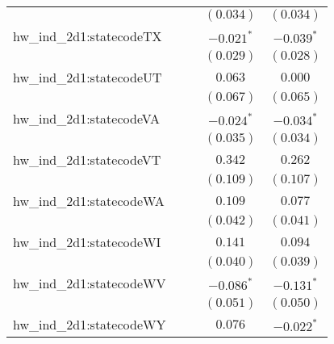 \begin{center}
\begin{longtable}{l c c c c}
                         &                       &                       & $(0.034)$             & $(0.034)$             \\
hw\_ind\_2d1:statecodeTX &                       &                       & $\mathbf{-0.021}^{*}$ & $\mathbf{-0.039}^{*}$ \\
                         &                       &                       & $(0.029)$             & $(0.028)$             \\
hw\_ind\_2d1:statecodeUT &                       &                       & $0.063$               & $0.000$               \\
                         &                       &                       & $(0.067)$             & $(0.065)$             \\
hw\_ind\_2d1:statecodeVA &                       &                       & $\mathbf{-0.024}^{*}$ & $\mathbf{-0.034}^{*}$ \\
                         &                       &                       & $(0.035)$             & $(0.034)$             \\
hw\_ind\_2d1:statecodeVT &                       &                       & $0.342$               & $0.262$               \\
                         &                       &                       & $(0.109)$             & $(0.107)$             \\
hw\_ind\_2d1:statecodeWA &                       &                       & $0.109$               & $0.077$               \\
                         &                       &                       & $(0.042)$             & $(0.041)$             \\
hw\_ind\_2d1:statecodeWI &                       &                       & $0.141$               & $0.094$               \\
                         &                       &                       & $(0.040)$             & $(0.039)$             \\
hw\_ind\_2d1:statecodeWV &                       &                       & $\mathbf{-0.086}^{*}$ & $\mathbf{-0.131}^{*}$ \\
                         &                       &                       & $(0.051)$             & $(0.050)$             \\
hw\_ind\_2d1:statecodeWY &                       &                       & $0.076$               & $\mathbf{-0.022}^{*}$ \\

\end{longtable}
\end{center}
